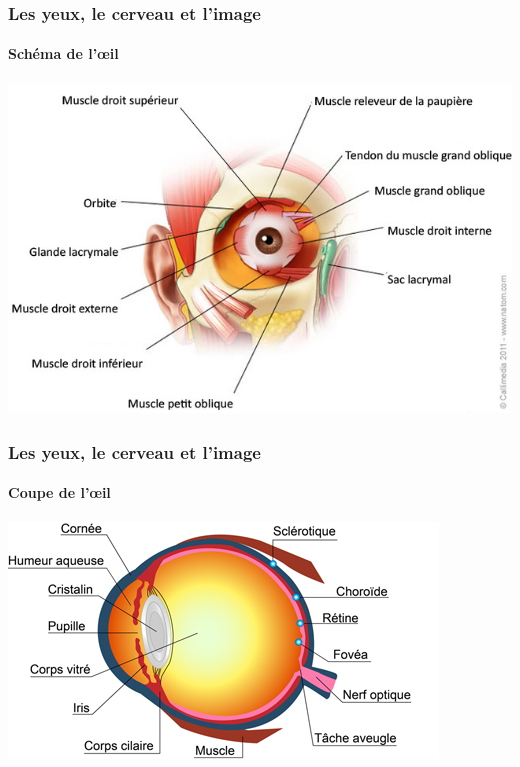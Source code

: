 \documentclass[red]{beamer}
\begin{document}
	
	\begin{frame}
	\frametitle{Les yeux, le cerveau et l'image}
	\framesubtitle{Schéma de l'œil}
	\begin{center}
    \includegraphics[scale=0.47]{oeil.jpg}
    \end{center}
	\end{frame}
	
	\begin{frame}
	\frametitle{Les yeux, le cerveau et l'image}
	\framesubtitle{Coupe de l'œil}
	\begin{center}
    \includegraphics[scale=0.7]{schema_oeil.jpg}
    \end{center}
    \end{frame}
	
\end{document}
